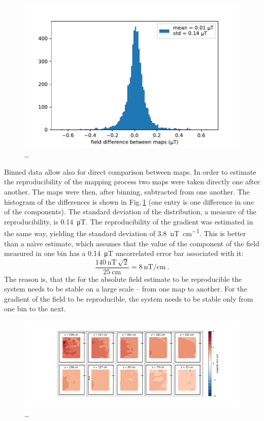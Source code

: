 \begin{figure}
  \centering
  \includegraphics[width=0.8\linewidth]{gfx/mapping/lpsc/reproducibility_field.pdf}
  \caption{\ldots}
  \label{fig:mapping_bastille_reproducibility}
\end{figure}

Binned data allow also for direct comparison between maps. In order to estimate the reproducibility of the mapping process two maps were taken directly one after another. The maps were then, after binning, subtracted from one another. The histogram of the differences is shown in Fig.\,\ref{fig:mapping_bastille_reproducibility} (one entry is one difference in one of the components). The standard deviation of the distribution, a measure of the reproducibility, is \SI{0.14}{\micro\tesla}. The reproducibility of the gradient was estimated in the same way, yielding the standard deviation of \SI[per-mode=symbol]{3.8}{\nano\tesla\per\centi\meter}. This is better than a na\"{\i}ve estimate, which assumes that the value of the component of the field measured in one bin has a \SI{0.14}{\micro\tesla} uncorrelated error bar associated with it:
\begin{equation}
  \frac{\SI{140}{\nano\tesla} \, \sqrt{2}}{\SI{25}{\centi\meter}} = \SI[per-mode=symbol]{8}{\nano\tesla\per\centi\meter} \ .
\end{equation}
The reason is, that the for the absolute field estimate to be reproducible the system needs to be stable on a large scale -- from one map to another. For the gradient of the field to be reproducible, the system needs to be stable only from one bin to the next.

\begin{figure}
  \centering
  \includegraphics[width=\linewidth]{gfx/mapping/lpsc/bastille_crane_change_magnitude.pdf}
  \caption{\ldots}
  \label{fig:mapping_bastille_crane_change}
\end{figure}

